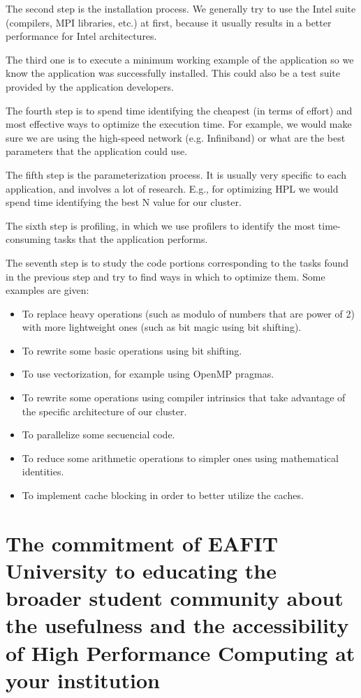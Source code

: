 \documentclass[11pt,a4paper,twocolumn]{article}
\begin{document}
The second step is the installation process. We generally try to use the Intel suite (compilers, MPI libraries, etc.) at first, because it usually results in a better performance for Intel architectures. 

The third one is to execute a minimum working example of the application so we know the application was successfully installed. This could also be a test suite provided by the application developers.

The fourth step is to spend time identifying the cheapest (in terms of effort) and most effective ways to optimize the execution time. For example, we would make sure we are using the high-speed network (e.g. Infiniband) or what are the best parameters that the application could use. 

The fifth step is the parameterization process. It is usually very specific to each application, and involves a lot of research. E.g., for optimizing HPL we would spend time identifying the best N value for our cluster.

The sixth step is profiling, in which we use profilers to identify the most time-consuming tasks that the application performs. 

The seventh step is to study the code portions corresponding to the tasks found in the previous step and try to find ways in which to optimize them. Some examples are given:

\begin{itemize}
	\item To replace heavy operations (such as modulo of numbers that are power of 2) with more lightweight ones (such as bit magic using bit shifting).
	\item To rewrite some basic operations using bit shifting.
	\item To use vectorization, for example using OpenMP pragmas.
	\item To rewrite some operations using compiler intrinsics that take advantage of the specific architecture of our cluster.
	\item To parallelize some secuencial code.
	\item To reduce some arithmetic operations to simpler ones using mathematical identities.
	\item To implement cache blocking in order to better utilize the caches.
\end{itemize}

\section{The commitment of EAFIT University to educating the broader student community about the usefulness and the accessibility of High Performance Computing at your institution}
\end{document}
